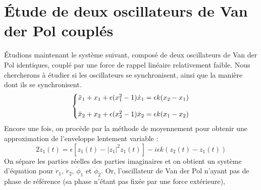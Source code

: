 \chapter{Étude de deux oscillateurs de Van der Pol couplés}
%
Étudions maintenant le système suivant, composé de deux oscillateurs de Van der Pol identiques, couplé par une force de rappel linéaire relativement faible. Nous chercherons à étudier si les oscillateurs se synchronisent, ainsi que la manière dont ils se synchronisent.
%
\begin{equation}
  \left\{\begin{array}{@{}l@{}}
    \ddot{x}_1 + x_1  + \epsilon(x_1^2 - 1)\dot{x}_1 = \epsilon k(x_2 - x_1) \\
    \\
    \ddot{x}_2 + x_2 + \epsilon(x_2^2 - 1)\dot{x}_2 = \epsilon k(x_1 - x_2)
  \end{array}\right.\,
  \label{eq:coupled_vdp}
\end{equation}
%
Encore une fois, on procède par la méthode de moyennement pour obtenir une approximation de l'enveloppe lentement variable :
%
\begin{equation}
    2\dot{z}_1(t) = 
     \epsilon \left[ z_1(t) - |z_1|^2z_1(t) \right]
    - i\epsilon k\left( z_2(t) - z_1(t)\right)
\end{equation}
%
On sépare les parties réelles des parties imaginaires et on obtient un système d'équation pour $\dot{r}_1$,  $\dot{r}_2$,  $\dot{\phi}_1$ et  $\dot{\phi}_2$. %
%
%
%
%
Or, l'oscillateur de Van der Pol n'ayant pas de phase de référence (sa phase n'étant pas fixée par une force extérieure), 

